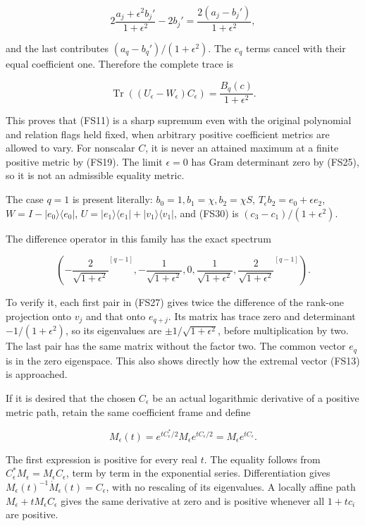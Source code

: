 \[
2\frac{a_j+\epsilon^2b_j'}{1+\epsilon^2}-2b_j'
=\frac{2(a_j-b_j')}{1+\epsilon^2},
\]

and the last contributes \((a_q-b_q')/(1+\epsilon^2)\). The \(e_q\) terms cancel with their equal coefficient one. Therefore the complete trace is

\[
\boxed{
\operatorname{Tr}((U_\epsilon-W_\epsilon)C_\epsilon)
=\frac{B_q(c)}{1+\epsilon^2}.
}
\tag{FS30}
\]

This proves that (FS11) is a sharp supremum even with the original polynomial and relation flags held fixed, when arbitrary positive coefficient metrics are allowed to vary. For nonscalar \(C\), it is never an attained maximum at a finite positive metric by (FS19). The limit \(\epsilon=0\) has Gram determinant zero by (FS25), so it is not an admissible equality metric.

The case \(q=1\) is present literally: \(b_0=1,b_1=\chi,b_2=\chi S\), \(T_\epsilon b_2=e_0+\epsilon e_2\), \(W=I-|e_0\rangle\langle e_0|\), \(U=|e_1\rangle\langle e_1|+|v_1\rangle\langle v_1|\), and (FS30) is \((c_3-c_1)/(1+\epsilon^2)\).

The difference operator in this family has the exact spectrum

\[
\left(
-\frac2{\sqrt{1+\epsilon^2}}^{[q-1]},
-\frac1{\sqrt{1+\epsilon^2}},0,
\frac1{\sqrt{1+\epsilon^2}},
\frac2{\sqrt{1+\epsilon^2}}^{[q-1]}
\right).
\tag{FS31}
\]

To verify it, each first pair in (FS27) gives twice the difference of the rank-one projection onto \(v_j\) and that onto \(e_{q+j}\). Its matrix has trace zero and determinant \(-1/(1+\epsilon^2)\), so its eigenvalues are \(\pm1/\sqrt{1+\epsilon^2}\), before multiplication by two. The last pair has the same matrix without the factor two. The common vector \(e_q\) is in the zero eigenspace. This also shows directly how the extremal vector (FS13) is approached.

If it is desired that the chosen \(C_\epsilon\) be an actual logarithmic derivative of a positive metric path, retain the same coefficient frame and define

\[
M_\epsilon(t)
=e^{tC_\epsilon^*/2}M_\epsilon e^{tC_\epsilon/2}
=M_\epsilon e^{tC_\epsilon}.
\tag{FS32}
\]

The first expression is positive for every real \(t\). The equality follows from \(C_\epsilon^*M_\epsilon=M_\epsilon C_\epsilon\), term by term in the exponential series. Differentiation gives \(M_\epsilon(t)^{-1}\dot M_\epsilon(t)=C_\epsilon\), with no rescaling of its eigenvalues. A locally affine path \(M_\epsilon+tM_\epsilon C_\epsilon\) gives the same derivative at zero and is positive whenever all \(1+tc_i\) are positive.

